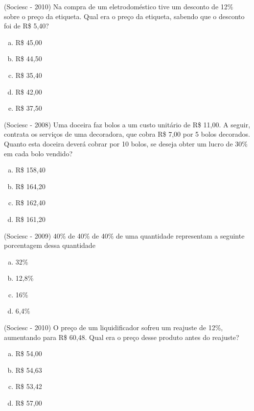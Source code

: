  \begin{exer}
 (Sociesc - 2010) Na compra de um eletrodoméstico tive um desconto de 12\% sobre o preço da etiqueta. Qual era o preço da etiqueta, sabendo que o desconto foi de R\$ 5,40?
  \begin{enumerate}[a)]
  \item R\$ 45,00
  \item R\$ 44,50
  \item R\$ 35,40
  \item R\$ 42,00
  \item R\$ 37,50
 \end{enumerate}
 \end{exer} 
 
 \begin{exer}
 (Sociesc - 2008) Uma doceira faz bolos a um custo unitário de R\$ 11,00. A seguir, contrata os serviços de uma decoradora, que cobra R\$ 7,00 por 5 bolos decorados. Quanto esta doceira deverá cobrar por 10 bolos, se deseja obter um lucro de 30\% em cada bolo vendido?
  \begin{enumerate}[a)]
  \item R\$ 158,40
  \item R\$ 164,20
  \item R\$ 162,40
  \item R\$ 161,20
 \end{enumerate}
 \end{exer} 
 
 \begin{exer}
 (Sociesc - 2009) 40\% de 40\% de 40\% de uma quantidade representam a seguinte porcentagem dessa quantidade
  \begin{enumerate}[a)]
  \item 32\%
  \item 12,8\%
  \item 16\%
  \item 6,4\%
 \end{enumerate}
 \end{exer} 
 
 \begin{exer}
 (Sociesc - 2010) O preço de um liquidificador sofreu um reajuste de 12\%, aumentando para R\$ 60,48. Qual era o preço desse produto antes do reajuste?
  \begin{enumerate}[a)]
  \item R\$ 54,00
  \item R\$ 54,63
  \item R\$ 53,42
  \item R\$ 57,00
 \end{enumerate}
 \end{exer} 
 
